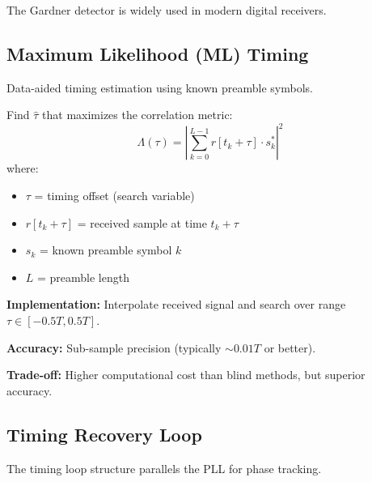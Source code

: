 The Gardner detector is widely used in modern digital receivers.

\subsection{Maximum Likelihood (ML) Timing}

Data-aided timing estimation using known preamble symbols.

Find $\hat{\tau}$ that maximizes the correlation metric:
\begin{equation}
\Lambda(\tau) = \left|\sum_{k=0}^{L-1} r[t_k + \tau] \cdot s_k^*\right|^2
\end{equation}
where:
\begin{itemize}
\item $\tau$ = timing offset (search variable)
\item $r[t_k + \tau]$ = received sample at time $t_k + \tau$
\item $s_k$ = known preamble symbol $k$
\item $L$ = preamble length
\end{itemize}

\textbf{Implementation:} Interpolate received signal and search over range $\tau \in [-0.5T, 0.5T]$.

\textbf{Accuracy:} Sub-sample precision (typically $\sim 0.01T$ or better).

\textbf{Trade-off:} Higher computational cost than blind methods, but superior accuracy.

\subsection{Timing Recovery Loop}

The timing loop structure parallels the PLL for phase tracking.

\begin{center}
\end{center}

